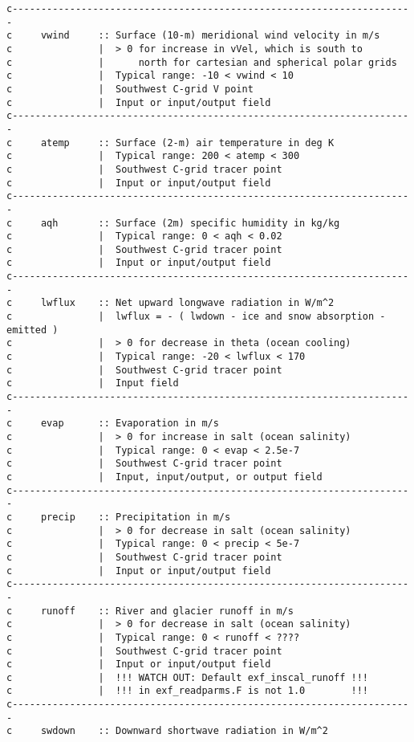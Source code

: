 {\begin{verbatim}
c----------------------------------------------------------------------
c     vwind     :: Surface (10-m) meridional wind velocity in m/s
c               |  > 0 for increase in vVel, which is south to
c               |      north for cartesian and spherical polar grids
c               |  Typical range: -10 < vwind < 10
c               |  Southwest C-grid V point
c               |  Input or input/output field
c----------------------------------------------------------------------
c     atemp     :: Surface (2-m) air temperature in deg K
c               |  Typical range: 200 < atemp < 300
c               |  Southwest C-grid tracer point
c               |  Input or input/output field
c----------------------------------------------------------------------
c     aqh       :: Surface (2m) specific humidity in kg/kg
c               |  Typical range: 0 < aqh < 0.02
c               |  Southwest C-grid tracer point
c               |  Input or input/output field
c----------------------------------------------------------------------
c     lwflux    :: Net upward longwave radiation in W/m^2
c               |  lwflux = - ( lwdown - ice and snow absorption - emitted )
c               |  > 0 for decrease in theta (ocean cooling)
c               |  Typical range: -20 < lwflux < 170
c               |  Southwest C-grid tracer point
c               |  Input field
c----------------------------------------------------------------------
c     evap      :: Evaporation in m/s
c               |  > 0 for increase in salt (ocean salinity)
c               |  Typical range: 0 < evap < 2.5e-7
c               |  Southwest C-grid tracer point
c               |  Input, input/output, or output field
c----------------------------------------------------------------------
c     precip    :: Precipitation in m/s
c               |  > 0 for decrease in salt (ocean salinity)
c               |  Typical range: 0 < precip < 5e-7
c               |  Southwest C-grid tracer point
c               |  Input or input/output field
c----------------------------------------------------------------------
c     runoff    :: River and glacier runoff in m/s
c               |  > 0 for decrease in salt (ocean salinity)
c               |  Typical range: 0 < runoff < ????
c               |  Southwest C-grid tracer point
c               |  Input or input/output field
c               |  !!! WATCH OUT: Default exf_inscal_runoff !!!
c               |  !!! in exf_readparms.F is not 1.0        !!!
c----------------------------------------------------------------------
c     swdown    :: Downward shortwave radiation in W/m^2

\end{verbatim}}

